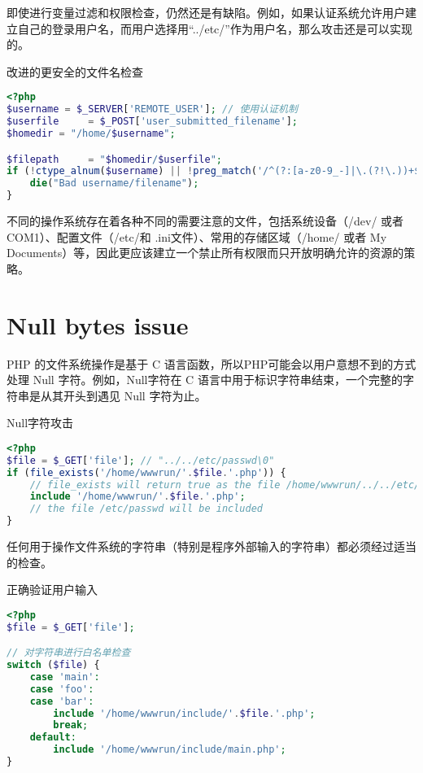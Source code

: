 即使进行变量过滤和权限检查，仍然还是有缺陷。例如，如果认证系统允许用户建立自己的登录用户名，而用户选择用“../etc/”作为用户名，那么攻击还是可以实现的。

\begin{example}
改进的更安全的文件名检查
\begin{lstlisting}[language=PHP]
<?php
$username = $_SERVER['REMOTE_USER']; // 使用认证机制
$userfile     = $_POST['user_submitted_filename'];
$homedir = "/home/$username";

$filepath     = "$homedir/$userfile";
if (!ctype_alnum($username) || !preg_match('/^(?:[a-z0-9_-]|\.(?!\.))+$/iD', $userfile)) {
    die("Bad username/filename");
}
\end{lstlisting}
\end{example}


不同的操作系统存在着各种不同的需要注意的文件，包括系统设备（/dev/ 或者 COM1）、配置文件（/etc/和 .ini文件）、常用的存储区域（/home/ 或者 My Documents）等，因此更应该建立一个禁止所有权限而只开放明确允许的资源的策略。

\section{Null bytes issue}


PHP 的文件系统操作是基于 C 语言函数，所以PHP可能会以用户意想不到的方式处理 Null 字符。例如，Null字符在 C 语言中用于标识字符串结束，一个完整的字符串是从其开头到遇见 Null 字符为止。

\begin{example}
Null字符攻击
\begin{lstlisting}[language=PHP]
<?php
$file = $_GET['file']; // "../../etc/passwd\0"
if (file_exists('/home/wwwrun/'.$file.'.php')) {
    // file_exists will return true as the file /home/wwwrun/../../etc/passwd exists
    include '/home/wwwrun/'.$file.'.php';
    // the file /etc/passwd will be included
}
\end{lstlisting}
\end{example}


任何用于操作文件系统的字符串（特别是程序外部输入的字符串）都必须经过适当的检查。

\begin{example}
正确验证用户输入
\begin{lstlisting}[language=PHP]
<?php
$file = $_GET['file']; 

// 对字符串进行白名单检查
switch ($file) {
    case 'main':
    case 'foo':
    case 'bar':
        include '/home/wwwrun/include/'.$file.'.php';
        break;
    default:
        include '/home/wwwrun/include/main.php';
}
\end{lstlisting}
\end{example}




